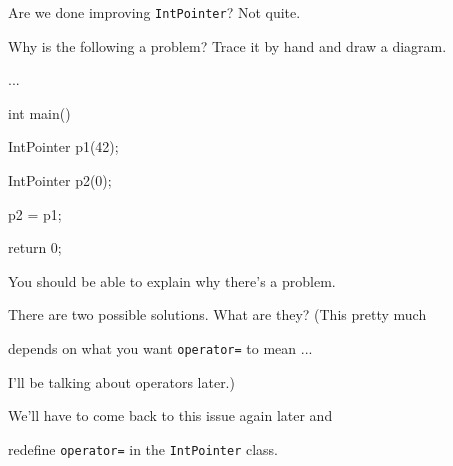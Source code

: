 Are we done improving \texttt{IntPointer}? Not quite.

Why is the following a problem? Trace it by hand and draw a diagram.



\begin{consolethree}[escapeinside=||]

...

int main()

{

    IntPointer p1(42);

    IntPointer p2(0);

    p2 = p1;

    return 0;

}

\end{consolethree}



You should be able to explain why there's a problem.

There are two possible solutions. What are they? (This pretty much

depends on what you want \texttt{operator=} to mean ...

I'll be talking about operators later.)

We'll have to come back to this issue again later and

redefine \texttt{operator=} in the \texttt{IntPointer} class.

